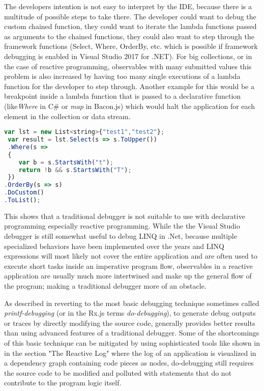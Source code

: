 The developers intention is not easy to interpret by the IDE, because there is a multitude of possible steps to take there. The developer could want to debug the custom chained function, they could want to iterate the lambda functions passed as arguments to the chained functions, they could also want to step through the framework functions (Select, Where, OrderBy, etc. which is possible if framework debugging is enabled in Visual Studio 2017 for .NET). 
For big collections, or in the case of reactive programming, observables with many submitted values this problem is also increased by having too many single executions of a lambda function for the developer to step through. Another example for this would be a breakpoint inside a lambda function that is passed to a declarative function (like\emph{Where} in C\# or \emph{map} in Bacon.js) which would halt the application for each element in the collection or data stream.

\begin{lstlisting}[language=JavaScript, caption={Simple example of .NET LINQ in C\# to show the steps the visual stidio 2017 for .NET debugger takes while debuggin step-by-step.},label={lst:CSharp_LINQ}]
 var lst = new List<string>{"test1","test2"};
 var result = lst.Select(s => s.ToUpper())
 .Where(s =>
 {
	var b = s.StartsWith("t");
	return !b && s.StartsWith("T");
 })
.OrderBy(s => s)
.DoCustom()
.ToList();
\end{lstlisting}


This shows that a traditional debugger is not suitable to use with declarative programming especially reactive programming. While the the Visual Studio debugger is still somewhat useful to debug LINQ in .Net, because multiple specialized behaviors have been implemented over the years and LINQ expressions will most likely not cover the entire application and are often used to execute short tasks inside an imperative program flow, observables in a reactive application are usually much more intertwined and make up the general flow of the program; making a traditional debugger more of an obstacle.

As described in \cite{MSDN_DebugginObservables} reverting to the most basic debugging technique sometimes called \emph{printf-debugging} (or in the Rx.js terms \emph{do-debugging}), to generate debug outputs or traces by directly modifying the source code, generally provides better results than using advanced features of a traditional debugger.
Some of the shortcomings of this basic technique can be mitigated by using sophisticated tools like shown in \cite{ShinyGraphFromLog} in the section "The Reactive Log" where the log of an application is visualized in a dependency graph containing code pieces as nodes, do-debugging still requires the source code to be modified and polluted with statements that do not contribute to the program logic itself.

